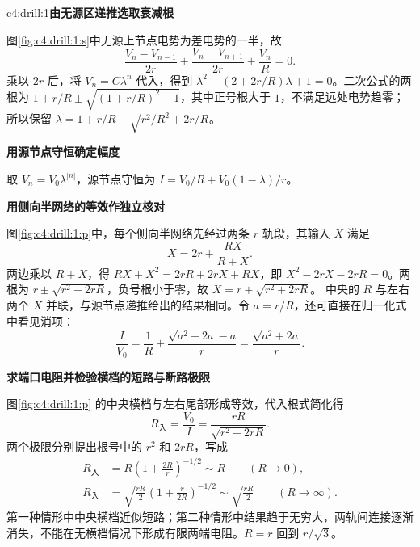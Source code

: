 \LectureAnswerSection

\begin{drillsolution}{c4:drill:1}\textbf{由无源区递推选取衰减根}\par\nobreak
图\ref{fig:c4:drill:1:s}中无源上节点电势为差电势的一半，故
\[
 \frac{V_n-V_{n-1}}{2r}+\frac{V_n-V_{n+1}}{2r}+\frac{V_n}{R}=0.
\]
乘以 $2r$ 后，将 $V_n=C\lambda^n$ 代入，得到 $\lambda^2-(2+2r/R)\lambda+1=0$。二次公式的两根为 $1+r/R\pm\sqrt{(1+r/R)^2-1}$，其中正号根大于 $1$，不满足远处电势趋零；所以保留
$\lambda=1+r/R-\sqrt{r^2/R^2+2r/R}$。

\par\medskip{}\noindent\textbf{用源节点守恒确定幅度}\par\nobreak
取 $V_n=V_0\lambda^{|n|}$，源节点守恒为 $I=V_0/R+V_0(1-\lambda)/r$。




\par\medskip{}\noindent\textbf{用侧向半网络的等效作独立核对}\par\nobreak
图\ref{fig:c4:drill:1:p}中，每个侧向半网络先经过两条 $r$ 轨段，其输入 $X$ 满足
\[
 X=2r+\frac{RX}{R+X}.
\]
两边乘以 $R+X$，得 $RX+X^2=2rR+2rX+RX$，即 $X^2-2rX-2rR=0$。两根为 $r\pm\sqrt{r^2+2rR}$，负号根小于零，故 $X=r+\sqrt{r^2+2rR}$。
中央的 $R$ 与左右两个 $X$ 并联，与源节点递推给出的结果相同。令 $a=r/R$，还可直接在归一化式中看见消项：
\[
 \frac I{V_0}=\frac1R+\frac{\sqrt{a^2+2a}-a}{r}
 =\frac{\sqrt{a^2+2a}}r.
\]




\par\medskip{}\noindent\textbf{求端口电阻并检验横档的短路与断路极限}\par\nobreak
图\ref{fig:c4:drill:1:p} 的中央横档与左右尾部形成等效，代入根式简化得
\[
 R_{\text{入}}=\frac{V_0}{I}=\frac{rR}{\sqrt{r^2+2rR}}.
\]
两个极限分别提出根号中的 $r^2$ 和 $2rR$，写成
\[
 \begin{aligned}
 R_{\text{入}}&=R\left(1+\frac{2R}{r}\right)^{-1/2}
 \sim R\qquad(R\to0),\\
 R_{\text{入}}&=\sqrt{\frac{rR}{2}}
 \left(1+\frac{r}{2R}\right)^{-1/2}
 \sim\sqrt{\frac{rR}{2}}\qquad(R\to\infty).
 \end{aligned}
\]
第一种情形中中央横档近似短路；第二种情形中结果趋于无穷大，两轨间连接逐渐消失，不能在无横档情况下形成有限两端电阻。$R=r$ 回到 $r/\sqrt3$。\end{drillsolution}
